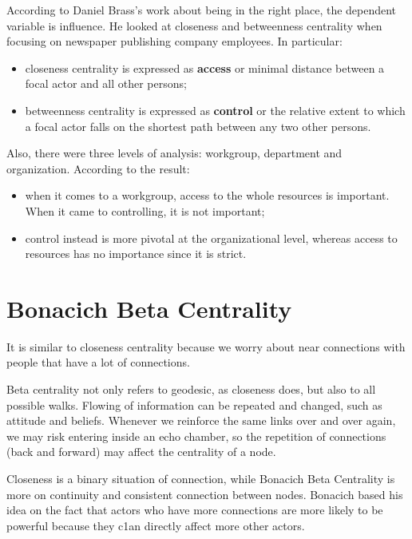 \documentclass[
  notitlepage,
  onecolumn,
  openany]{book}
\begin{document}
According to Daniel Brass's work about being in the right place, the dependent variable is influence. He looked at closeness and betweenness centrality when focusing on newspaper publishing company employees. In particular:

\begin{itemize}
\item
  closeness centrality is expressed as \textbf{access} or minimal distance between a focal actor and all other persons;
\item
  betweenness centrality is expressed as \textbf{control} or the relative extent to which a focal actor falls on the shortest path between any two other persons.
\end{itemize}

Also, there were three levels of analysis: workgroup, department and organization. According to the result:

\begin{itemize}
\item
  when it comes to a workgroup, access to the whole resources is important. When it came to controlling, it is not important;
\item
  control instead is more pivotal at the organizational level, whereas access to resources has no importance since it is strict.
\end{itemize}

\hypertarget{bonacich-beta-centrality}{%
\section{Bonacich Beta Centrality}\label{bonacich-beta-centrality}}

It is similar to closeness centrality because we worry about near connections with people that have a lot of connections.

Beta centrality not only refers to geodesic, as closeness does, but also to all possible walks. Flowing of information can be repeated and changed, such as attitude and beliefs. Whenever we reinforce the same links over and over again, we may risk entering inside an echo chamber, so the repetition of connections (back and forward) may affect the centrality of a node.

Closeness is a binary situation of connection, while Bonacich Beta Centrality is more on continuity and consistent connection between nodes. Bonacich based his idea on the fact that actors who have more connections are more likely to be powerful because they c1an directly affect more other actors.
\end{document}
